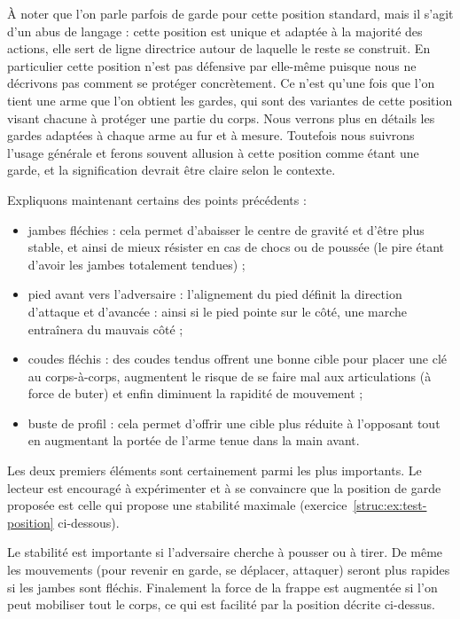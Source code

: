 À noter que l'on parle parfois de garde pour cette position standard, mais il s'agit d'un abus de langage : cette position est unique et adaptée à la majorité des actions, elle sert de ligne directrice autour de laquelle le reste se construit.
En particulier cette position n'est pas défensive par elle-même puisque nous ne décrivons pas comment se protéger concrètement.
Ce n'est qu'une fois que l'on tient une arme que l'on obtient les gardes, qui sont des variantes de cette position visant chacune à protéger une partie du corps.
Nous verrons plus en détails les gardes adaptées à chaque arme au fur et à mesure.
Toutefois nous suivrons l'usage générale et ferons souvent allusion à cette position comme étant une garde, et la signification devrait être claire selon le contexte.

\noindent
Expliquons maintenant certains des points précédents :
\begin{itemize}
	\item jambes fléchies : cela permet d'abaisser le centre de gravité et d'être plus stable, et ainsi de mieux résister en cas de chocs ou de poussée (le pire étant d'avoir les jambes totalement tendues) ;
	
	\item pied avant vers l'adversaire : l'alignement du pied définit la direction d'attaque et d'avancée : ainsi si le pied pointe sur le côté, une marche entraînera du mauvais côté ;
	
	\item coudes fléchis : des coudes tendus offrent une bonne cible pour placer une clé au corps-à-corps, augmentent le risque de se faire mal aux articulations (à force de buter) et enfin diminuent la rapidité de mouvement ;
	
	\item buste de profil : cela permet d'offrir une cible plus réduite à l'opposant tout en augmentant la portée de l'arme tenue dans la main avant.
\end{itemize}
Les deux premiers éléments sont certainement parmi les plus importants.
Le lecteur est encouragé à expérimenter et à se convaincre que la position de garde proposée est celle qui propose une stabilité maximale (exercice~\ref{struc:ex:test-position} ci-dessous).

Le stabilité est importante si l'adversaire cherche à pousser ou à tirer.
De même les mouvements (pour revenir en garde, se déplacer, attaquer) seront plus rapides si les jambes sont fléchis.
Finalement la force de la frappe est augmentée si l'on peut mobiliser tout le corps, ce qui est facilité par la position décrite ci-dessus.


